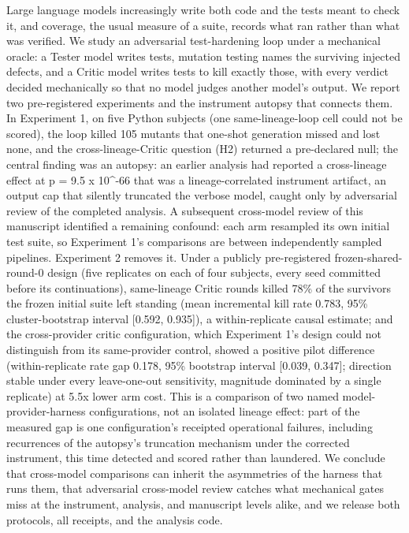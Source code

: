 \documentclass[
  11pt,
]{article}
\newcounter{none} %
\begin{document}
Large language models increasingly write both code and the tests meant
to check it, and coverage, the usual measure of a suite, records what
ran rather than what was verified. We study an adversarial
test-hardening loop under a mechanical oracle: a Tester model writes
tests, mutation testing names the surviving injected defects, and a
Critic model writes tests to kill exactly those, with every verdict
decided mechanically so that no model judges another model's output. We
report two pre-registered experiments and the instrument autopsy that
connects them. In Experiment 1, on five Python subjects (one
same-lineage-loop cell could not be scored), the loop killed 105 mutants
that one-shot generation missed and lost none, and the
cross-lineage-Critic question (H2) returned a pre-declared null; the
central finding was an autopsy: an earlier analysis had reported a
cross-lineage effect at p = 9.5 x 10\^{}-66 that was a
lineage-correlated instrument artifact, an output cap that silently
truncated the verbose model, caught only by adversarial review of the
completed analysis. A subsequent cross-model review of this manuscript
identified a remaining confound: each arm resampled its own initial test
suite, so Experiment 1's comparisons are between independently sampled
pipelines. Experiment 2 removes it. Under a publicly pre-registered
frozen-shared-round-0 design (five replicates on each of four subjects,
every seed committed before its continuations), same-lineage Critic
rounds killed 78\% of the survivors the frozen initial suite left
standing (mean incremental kill rate 0.783, 95\% cluster-bootstrap
interval {[}0.592, 0.935{]}), a within-replicate causal estimate; and
the cross-provider critic configuration, which Experiment 1's design
could not distinguish from its same-provider control, showed a positive
pilot difference (within-replicate rate gap 0.178, 95\% bootstrap
interval {[}0.039, 0.347{]}; direction stable under every leave-one-out
sensitivity, magnitude dominated by a single replicate) at 5.5x lower
arm cost. This is a comparison of two named model-provider-harness
configurations, not an isolated lineage effect: part of the measured gap
is one configuration's receipted operational failures, including
recurrences of the autopsy's truncation mechanism under the corrected
instrument, this time detected and scored rather than laundered. We
conclude that cross-model comparisons can inherit the asymmetries of the
harness that runs them, that adversarial cross-model review catches what
mechanical gates miss at the instrument, analysis, and manuscript levels
alike, and we release both protocols, all receipts, and the analysis
code.
\end{document}
